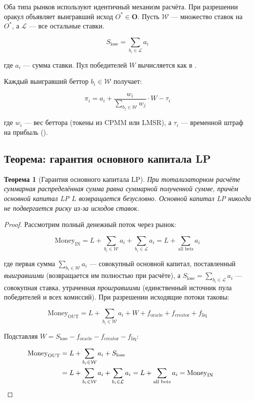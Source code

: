\documentclass{ledger}
\theoremstyle{plain}
\newtheorem{theorem}{Теорема}
\theoremstyle{remark}
\begin{document}
Оба типа рынков используют идентичный механизм расчёта. При разрешении оракул
объявляет выигравший исход $O^* \in \mathbf{O}$. Пусть $\mathcal{W}$ --- множество
ставок на $O^*$, а $\mathcal{L}$ --- все остальные ставки.

\[
S_{\text{lose}} = \sum_{b_i \in \mathcal{L}} a_i
\]

где $a_i$ --- сумма ставки. Пул победителей $W$ вычисляется как в .

Каждый выигравший беттор $b_i \in \mathcal{W}$ получает:

\[
\pi_i = a_i + \frac{w_i}{\sum_{b_j \in \mathcal{W}} w_j} \cdot W - \tau_i
\]

где $w_i$ --- вес беттора (токены из CPMM или LMSR), а $\tau_i$ --- временной штраф
на прибыль ().

\subsection{Теорема: гарантия основного капитала LP}\label{sec:thm1}

\begin{theorem}[Гарантия основного капитала LP]\label{thm:lp}
При тотализаторном расчёте суммарная распределённая сумма равна суммарной
полученной сумме, причём основной капитал LP $L$ возвращается безусловно. Основной
капитал LP никогда не подвергается риску из-за исходов ставок.
\end{theorem}

\begin{proof}
Рассмотрим полный денежный поток через рынок:

\[
\text{Money}_{\text{IN}} = L + \sum_{b_i \in \mathcal{W}} a_i +
\sum_{b_i \in \mathcal{L}} a_i = L + \sum_{\text{all bets}} a_i
\]

где первая сумма $\sum_{b_i \in \mathcal{W}} a_i$ --- совокупный основной капитал,
поставленный \emph{выигравшими} (возвращается им полностью при расчёте), а
$S_{\text{lose}} = \sum_{b_i \in \mathcal{L}} a_i$ --- совокупная ставка, утраченная
\emph{проигравшими} (единственный источник пула победителей и всех комиссий). При
разрешении исходящие потоки таковы:

\[
\text{Money}_{\text{OUT}} = L + \sum_{b_i \in \mathcal{W}} a_i + W +
f_{\text{oracle}} + f_{\text{creator}} + f_{\text{liq}}
\]

Подставляя $W = S_{\text{lose}} - f_{\text{oracle}} - f_{\text{creator}} -
f_{\text{liq}}$:

\begin{align*}
\text{Money}_{\text{OUT}}
&= L + \sum_{b_i \in \mathcal{W}} a_i + S_{\text{lose}} \\
&= L + \sum_{b_i \in \mathcal{W}} a_i + \sum_{b_i \in \mathcal{L}} a_i
 = L + \sum_{\text{all bets}} a_i = \text{Money}_{\text{IN}} \qquad \qedhere
\end{align*}
\end{proof}
\end{document}
